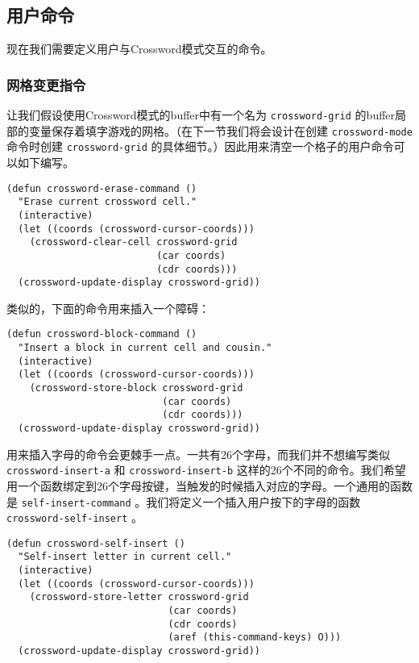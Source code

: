 \subsection{用户命令}
\label{section:10-User-Commands}

现在我们需要定义用户与Crossword模式交互的命令。

\subsubsection{网格变更指令}
\label{section:10-Grid-changing-commands}

让我们假设使用Crossword模式的buffer中有一个名为 \texttt{crossword-grid} 的buffer局部的变量保存着填字游戏的网格。（在下一节我们将会设计在创建 \texttt{crossword-mode} 命令时创建 \texttt{crossword-grid} 的具体细节。）因此用来清空一个格子的用户命令可以如下编写。

\begin{verbatim}
(defun crossword-erase-command ()
  "Erase current crossword cell."
  (interactive)
  (let ((coords (crossword-cursor-coords)))
    (crossword-clear-cell crossword-grid
                          (car coords)
                          (cdr coords)))
  (crossword-update-display crossword-grid))
\end{verbatim}

类似的，下面的命令用来插入一个障碍：

\begin{verbatim}
(defun crossword-block-command ()
  "Insert a block in current cell and cousin."
  (interactive)
  (let ((coords (crossword-cursor-coords)))
    (crossword-store-block crossword-grid
                           (car coords)
                           (cdr coords)))
  (crossword-update-display crossword-grid))
\end{verbatim}

用来插入字母的命令会更棘手一点。一共有26个字母，而我们并不想编写类似 \texttt{crossword-insert-a} 和 \texttt{crossword-insert-b} 这样的26个不同的命令。我们希望用一个函数绑定到26个字母按键，当触发的时候插入对应的字母。一个通用的函数是 \texttt{self-insert-command} 。我们将定义一个插入用户按下的字母的函数 \texttt{crossword-self-insert} 。

\begin{verbatim}
(defun crossword-self-insert ()
  "Self-insert letter in current cell."
  (interactive)
  (let ((coords (crossword-cursor-coords)))
    (crossword-store-letter crossword-grid
                            (car coords)
                            (cdr coords)
                            (aref (this-command-keys) O)))
  (crossword-update-display crossword-grid))
\end{verbatim}

